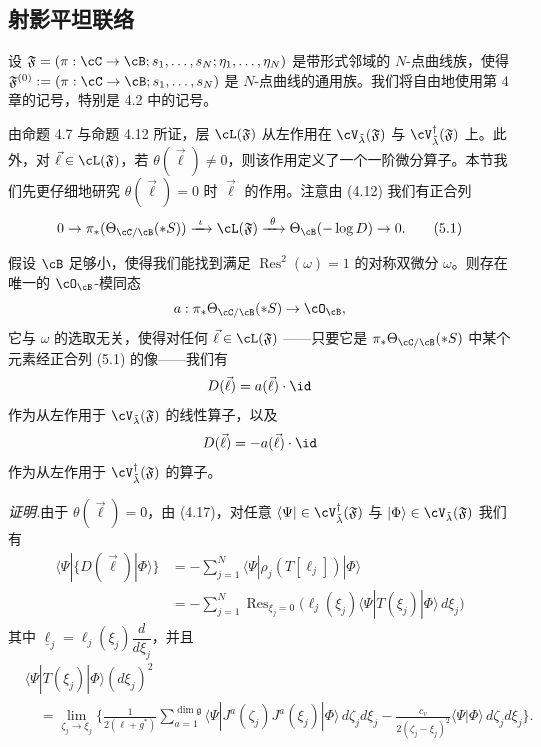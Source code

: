 
\subsection{射影平坦联络}


设 $\mathfrak F=(\pi:\cC\to\cB;s_1,\dots,s_N;\eta_1,\dots,\eta_N)$ 是带形式邻域的 $N$-点曲线族，使得 $\mathfrak F^{(0)}:=(\pi:\cC\to\cB;s_1,\dots,s_N)$ 是 $N$-点曲线的通用族。我们将自由地使用第 4 章的记号，特别是 4.2 中的记号。

由命题 4.7 与命题 4.12 所证，层 $\cL(\mathfrak F)$ 从左作用在 $\cV_{\tilde\lambda}(\mathfrak F)$ 与 $\cV^\dagger_{\tilde\lambda}(\mathfrak F)$ 上。此外，对 $\vec\ell\in\cL(\mathfrak F)$，若 $\theta(\vec\ell)\ne0$，则该作用定义了一个一阶微分算子。本节我们先更仔细地研究 $\theta(\vec\ell)=0$ 时 $\vec\ell$ 的作用。注意由 (4.12) 我们有正合列
\begin{equation}
 0\to\pi_*(\Theta_{\cC/\cB}(*S))\xrightarrow{\ \iota\ }\cL(\mathfrak F)
 \xrightarrow{\ \theta\ }\Theta_\cB(-\log D)\to0. \tag{5.1}
\end{equation}

\begin{lemma}[5.1]
 假设 $\cB$ 足够小，使得我们能找到满足 $\operatorname{Res}^2(\omega)=1$ 的对称双微分 $\omega$。则存在唯一的 $\cO_\cB$-模同态
 \[
  a:\pi_*\Theta_{\cC/\cB}(*S)\to\cO_\cB,
 \]
 它与 $\omega$ 的选取无关，使得对任何 $\vec\ell\in\cL(\mathfrak F)$ ——只要它是 $\pi_*\Theta_{\cC/\cB}(*S)$ 中某个元素经正合列 (5.1) 的像——我们有
 \[
  D(\vec\ell)=a(\vec\ell)\cdot\id
 \]
 作为从左作用于 $\cV_{\tilde\lambda}(\mathfrak F)$ 的线性算子，以及
 \[
  D(\vec\ell)=-a(\vec\ell)\cdot\id
 \]
 作为从左作用于 $\cV^\dagger_{\tilde\lambda}(\mathfrak F)$ 的算子。
\end{lemma}

\noindent\textit{证明.}\quad 由于 $\theta(\vec\ell)=0$，由 (4.17)，对任意 $\langle\Psi|\in\cV^\dagger_{\tilde\lambda}(\mathfrak F)$ 与 $|\Phi\rangle\in\cV_{\tilde\lambda}(\mathfrak F)$ 我们有
\begin{align*}
 \langle\Psi|\{D(\vec\ell)|\Phi\rangle\}
 &=-\sum_{j=1}^{N}\langle\Psi|\rho_j(T[\ell_j])|\Phi\rangle\\
 &=-\sum_{j=1}^{N}\operatorname{Res}_{\xi_j=0}\big(\ell_j(\xi_j)\langle\Psi|T(\xi_j)|\Phi\rangle\,d\xi_j\big)
\end{align*}
其中 $\underline{\ell}_j=\ell_j(\xi_j)\dfrac{d}{d\xi_j}$，并且
\begin{align*}
 &\langle\Psi|T(\xi_j)|\Phi\rangle(d\xi_j)^2\\
 &\quad=\lim_{\zeta_j\to\xi_j}\Big\{\frac{1}{2(\ell+g^*)}
   \sum_{a=1}^{\dim\mathfrak g}\langle\Psi|J^a(\zeta_j)J^a(\xi_j)|\Phi\rangle\,d\zeta_jd\xi_j
   -\frac{c_v}{2(\zeta_j-\xi_j)^2}\langle\Psi|\Phi\rangle\,d\zeta_jd\xi_j\Big\}.
\end{align*}

